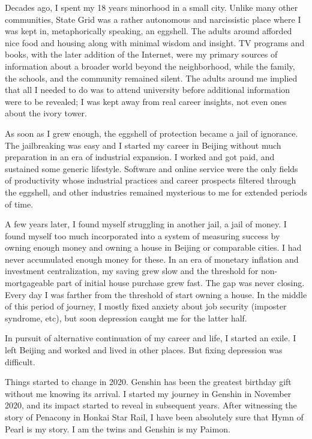 

Decades ago, I spent my 18 years minorhood in a small city. Unlike many other communities, State Grid was a rather autonomous and narcissistic place where I was kept in, metaphorically speaking, an eggshell. The adults around afforded nice food and housing along with minimal wisdom and insight. TV programs and books, with the later addition of the Internet, were my primary sources of information about a broader world beyond the neighborhood, while the family, the schools, and the community remained silent. The adults around me implied that all I needed to do was to attend university before additional information were to be revealed; I was kept away from real career insights, not even ones about the ivory tower.

As soon as I grew enough, the eggshell of protection became a jail of ignorance. The jailbreaking was easy and I started my career in Beijing without much preparation in an era of industrial expansion. I worked and got paid, and sustained some generic lifestyle. Software and online service were the only fields of productivity whose industrial practices and career prospects filtered through the eggshell, and other industries remained mysterious to me for extended periods of time.

A few years later, I found myself struggling in another jail, a jail of money. I found myself too much incorporated into a system of measuring success by owning enough money and owning a house in Beijing or comparable cities. I had never accumulated enough money for these. In an era of monetary inflation and investment centralization, my saving grew slow and the threshold for non-mortgageable part of initial house purchase grew fast. The gap was never closing. Every day I was farther from the threshold of start owning a house. In the middle of this period of journey, I mostly fixed anxiety about job security (imposter syndrome, etc), but soon depression caught me for the latter half.

In pursuit of alternative continuation of my career and life, I started an exile. I left Beijing and worked and lived in other places. But fixing depression was difficult. 

Things started to change in 2020. Genshin has been the greatest birthday gift without me knowing its arrival. I started my journey in Genshin in November 2020, and its impact started to reveal in subsequent years. After witnessing the story of Penacony in Honkai Star Rail, I have been absolutely sure that Hymn of Pearl is my story. I am the twins and Genshin is my Paimon.

